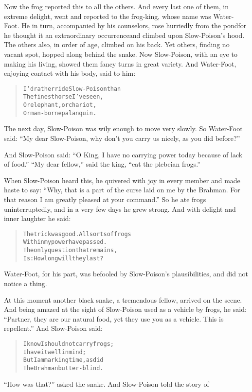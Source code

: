 \documentclass[article, twoside, 14pt]{memoir}
\renewenvironment{verbatim}{%
\begin{quote}%
\vskip -10pt%
\begin{alltt}\normalfont\large}{\end{alltt}%
\end{quote}%
\vskip -10pt
} %
\begin{document}
Now the frog reported this to all the others. And every last one of
them, in extreme delight, went and reported to the frog-king, whose
name was Water-Foot. He in turn, accompanied by his counselors,
rose hurriedly from the pond{\textemdash}for he thought it an extraordinary
occurrence{\textemdash}and climbed upon Slow-Poison's hood. The others also,
in order of age, climbed on his back. Yet others, finding no vacant
spot, hopped along behind the snake. Now Slow-Poison, with an eye
to making his living, showed them fancy turns in great variety. And
Water-Foot, enjoying contact with his body, said to him:

\begin{verbatim}
I'd rather ride Slow-Poison than
The finest horse I've seen,
Or elephant, or chariot,
Or man-borne palanquin.
\end{verbatim}
The next day, Slow-Poison was wily enough to move very slowly. So
Water-Foot said:
``My dear Slow-Poison, why don't you carry us nicely, as you did before?''

And Slow-Poison said:
``O King, I have no carrying power today because of lack of food.''
``My dear fellow,'' said the king, ``eat the plebeian frogs.''

When Slow-Poison heard this, he quivered with joy in every member
and made haste to say:
``Why, that is a part of the curse laid on me by the Brahman. For that reason I am greatly pleased at your command.''
So he ate frogs uninterruptedly, and in a very few days he grew
strong. And with delight and inner laughter he said:

\begin{verbatim}
The trick was good. All sorts of frogs
    Within my power have passed.
The only question that remains,
    Is: How long will they last?
\end{verbatim}
Water-Foot, for his part, was befooled by Slow-Poison's
plausibilities, and did not notice a thing.

At this moment another black snake, a tremendous fellow, arrived on
the scene. And being amazed at the sight of Slow-Poison used as a
vehicle by frogs, he said:
``Partner, they are our natural food, yet they use you as a vehicle. This is repellent.''
And Slow-Poison said:

\begin{verbatim}
I know I should not carry frogs;
    I have it well in mind;
But I am marking time, as did
    The Brahman butter-blind.
\end{verbatim}
``How was that?'' asked the snake. And Slow-Poison told the story
of
\end{document}
